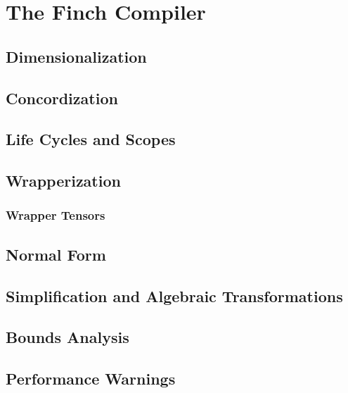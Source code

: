 \section{The Finch Compiler}

\subsection{Dimensionalization}

\subsection{Concordization}

\subsection{Life Cycles and Scopes}

\subsection{Wrapperization}

\subsubsection{Wrapper Tensors}

\subsection{Normal Form}

\subsection{Simplification and Algebraic Transformations}

\subsection{Bounds Analysis}

\subsection{Performance Warnings}
